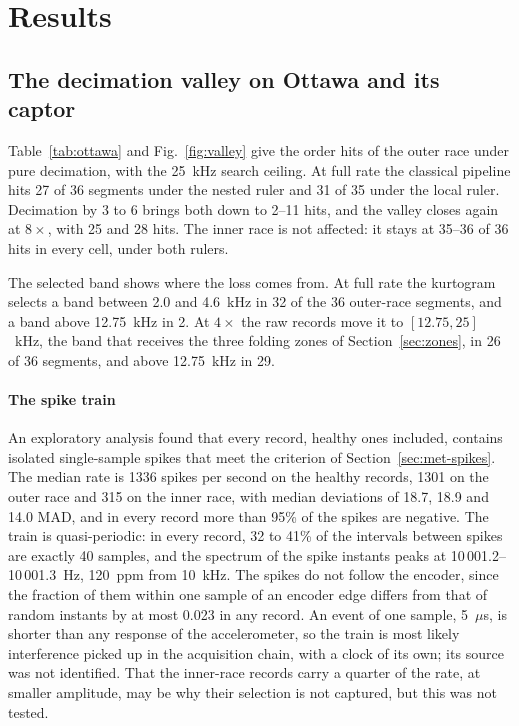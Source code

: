 \section{Results}
\label{sec:results}

\subsection{The decimation valley on Ottawa and its captor}
\label{sec:res-valley}

Table~\ref{tab:ottawa} and Fig.~\ref{fig:valley} give the order hits of the outer race under pure
decimation, with the 25~kHz search ceiling. At full rate the classical pipeline hits 27 of 36
segments under the nested ruler and 31 of 35 under the local ruler. Decimation by 3 to 6 brings both
down to 2--11 hits, and the valley closes again at $8\times$, with 25 and 28 hits. The inner race is
not affected: it stays at 35--36 of 36 hits in every cell, under both rulers.

The selected band shows where the loss comes from. At full rate the kurtogram selects a band
between 2.0 and 4.6~kHz in 32 of the 36 outer-race segments, and a band above 12.75~kHz in 2. At
$4\times$ the raw records move it to $[12.75, 25]$~kHz, the band that receives the three folding
zones of Section~\ref{sec:zones}, in 26 of 36 segments, and above 12.75~kHz in 29.

\paragraph{The spike train} An exploratory analysis found that every record, healthy ones included,
contains isolated single-sample spikes that meet the criterion of Section~\ref{sec:met-spikes}. The
median rate is 1336 spikes per second on the healthy records, 1301 on the outer race and 315 on the
inner race, with median deviations of 18.7, 18.9 and 14.0 MAD, and in every record more than 95\% of
the spikes are negative. The train is quasi-periodic: in every record, 32 to 41\% of the intervals
between spikes are exactly 40 samples, and the spectrum of the spike instants peaks at
10\,001.2--10\,001.3~Hz, 120~ppm from 10~kHz. The spikes do not follow the encoder, since the
fraction of them within one sample of an encoder edge differs from that of random instants by at
most 0.023 in any record. An event of one sample, 5~$\mu$s, is shorter than any response of the
accelerometer, so the train is most likely interference picked up in the acquisition chain, with a
clock of its own; its source was not identified. That the inner-race records carry a quarter of the
rate, at smaller amplitude, may be why their selection is not captured, but this was not tested.

